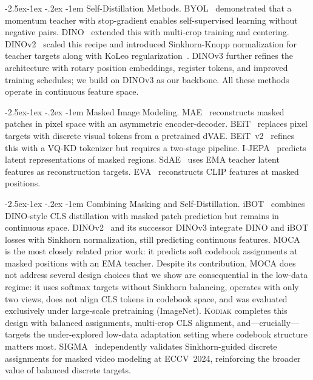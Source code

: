 \documentclass[runningheads]{llncs}
\makeatletter
\newcommand{\method}{\textsc{Kodiak}}
\renewcommand\paragraph{\@startsection{paragraph}{4}{\z@}%
  {-2.5ex\@plus -1ex \@minus -.2ex}%
  {-1em}%
  {\normalfont\normalsize\bfseries}}
\makeatother
\begin{document}
\paragraph{Self-Distillation Methods.}
BYOL~\cite{grill2020bootstrap} demonstrated that a momentum teacher with stop-gradient enables self-supervised learning without negative pairs.
DINO~\cite{caron2021emerging} extended this with multi-crop training and centering.
DINOv2~\cite{oquab2024dinov2} scaled this recipe and introduced Sinkhorn-Knopp normalization for teacher targets along with KoLeo regularization~\cite{sablayrolles2019spreading}.
DINOv3 further refines the architecture with rotary position embeddings, register tokens, and improved training schedules; we build on DINOv3 as our backbone.
All these methods operate in continuous feature space.

\paragraph{Masked Image Modeling.}
MAE~\cite{he2022masked} reconstructs masked patches in pixel space with an asymmetric encoder-decoder.
BEiT~\cite{bao2022beit} replaces pixel targets with discrete visual tokens from a pretrained dVAE.
BEiT~v2~\cite{peng2022beitv2} refines this with a VQ-KD tokenizer but requires a two-stage pipeline.
I-JEPA~\cite{assran2023self} predicts latent representations of masked regions.
SdAE~\cite{chen2022sdae} uses EMA teacher latent features as reconstruction targets.
EVA~\cite{fang2023eva} reconstructs CLIP features at masked positions.

\paragraph{Combining Masking and Self-Distillation.}
iBOT~\cite{zhou2022ibot} combines DINO-style CLS distillation with masked patch prediction but remains in continuous space.
DINOv2~\cite{oquab2024dinov2} and its successor DINOv3 integrate DINO and iBOT losses with Sinkhorn normalization, still predicting continuous features.
MOCA~\cite{gidaris2024moca} is the most closely related prior work: it predicts soft codebook assignments at masked positions with an EMA teacher.
Despite its contribution, MOCA does not address several design choices that we show are consequential in the low-data regime: it uses softmax targets without Sinkhorn balancing, operates with only two views, does not align CLS tokens in codebook space, and was evaluated exclusively under large-scale pretraining (ImageNet).
\method{} completes this design with balanced assignments, multi-crop CLS alignment, and---crucially---targets the under-explored low-data adaptation setting where codebook structure matters most.
SIGMA~\cite{li2024sigma} independently validates Sinkhorn-guided discrete assignments for masked video modeling at ECCV~2024, reinforcing the broader value of balanced discrete targets.
\end{document}
